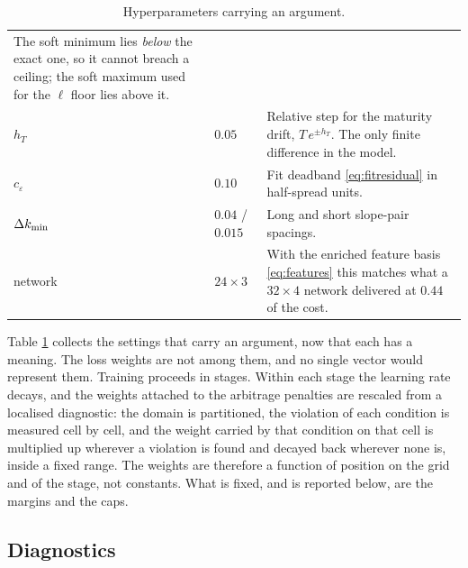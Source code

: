 \begin{table}[H]
\begin{tabular}{llp{12.4cm}}
  The soft minimum lies \emph{below} the exact one, so it cannot breach a ceiling; the soft maximum
  used for the $\ell$ floor lies above it.\\
$h_{T}$ & $0.05$ & Relative step for the maturity drift, $T\,e^{\pm h_{T}}$. The only finite
  difference in the model.\\
$c_{\varepsilon}$ & $0.10$ & Fit deadband \eqref{eq:fitresidual} in half-spread units.\\
$\Delta k_{\min}$ & $0.04$ / $0.015$ & Long and short slope-pair spacings.\\
network & $24\times3$ & With the enriched feature basis \eqref{eq:features} this matches what a
  $32\times4$ network delivered at $0.44$ of the cost.\\
\hline
\end{tabular}
\caption{Hyperparameters carrying an argument.}
\label{tab:hyper}
\end{table}



Table \ref{tab:hyper} collects the settings that carry an argument, now that each has a meaning.
The loss weights are not among them, and no single vector would represent them. Training proceeds in
stages. Within each stage the learning rate decays, and the weights attached to the arbitrage
penalties are rescaled from a localised diagnostic: the domain is partitioned, the violation of each
condition is measured cell by cell, and the weight carried by that condition on that cell is
multiplied up wherever a violation is found and decayed back wherever none is, inside a fixed
range. The weights are therefore a function of position on the
grid and of the stage, not constants. What is fixed, and is reported below, are the margins and the
caps.




\subsection{Diagnostics}
\label{subsec:diagnostics}


